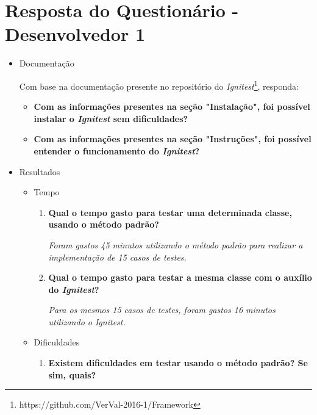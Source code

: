 \chapter{Resposta do Questionário - Desenvolvedor 1}
    
    \begin{itemize}
        \item Documentação
        
            Com base na documentação presente no repositório do \textit{Ignitest}\footnote{https://github.com/VerVal-2016-1/Framework}, responda:
            \begin{itemize}
                \item \textbf{Com as informações presentes na seção "Instalação", foi possível instalar o \textit{Ignitest} sem dificuldades?}
                \item \textbf{Com as informações presentes na seção "Instruções", foi possível entender o funcionamento do \textit{Ignitest}?}
            \end{itemize}
            
        \item Resultados
            \begin{itemize}
                \item Tempo
                    \begin{enumerate}
                        \item \textbf{Qual o tempo gasto para testar uma determinada classe, usando o método padrão?}
			  
			  \subitem \textit{Foram gastos 45 minutos utilizando o método padrão para realizar a implementação de 15 casos de testes.}
			  
                        \item \textbf{Qual o tempo gasto para testar a mesma classe com o auxílio do \textit{Ignitest}?}
			  
			  \subitem \textit{Para os mesmos 15 casos de testes, foram gastos 16 minutos utilizando o Ignitest.}
                        
                    \end{enumerate}
                \item Dificuldades
                    \begin{enumerate}
                        \item \textbf{Existem dificuldades em testar usando o método padrão? Se sim, quais?}
                        

\end{enumerate}
\end{itemize}
\end{itemize}
